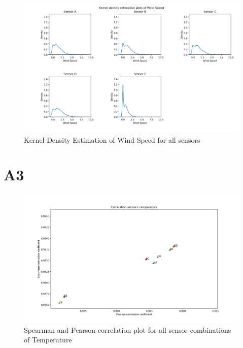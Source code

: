 \documentclass{article}
\begin{document}
            \begin{figure}
                \includegraphics[width=\textwidth]{kde_windspeed}
                \caption{Kernel Density Estimation of Wind Speed for all sensors}
            \end{figure}



\section{A3}
    \begin{figure}
        \includegraphics[width=\textwidth]{cor_temp}
        \caption{Spearman and Pearson correlation plot for all sensor combinations of Temperature}
    \end{figure}
\end{document}
